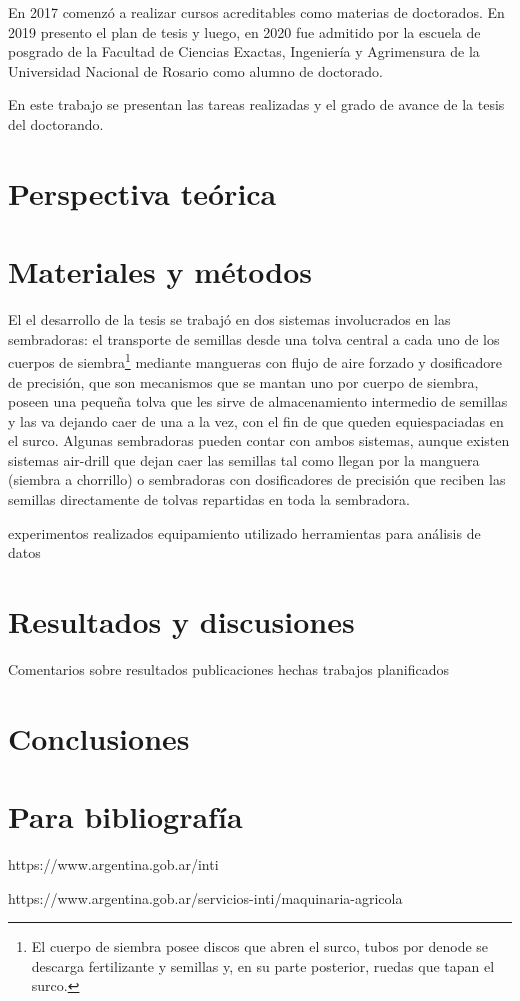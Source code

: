 \documentclass[12pt]{article}
\begin{document}
    En 2017 comenzó a realizar cursos acreditables como materias de doctorados. En 2019 presento el plan de tesis y luego, en 2020 fue admitido por la escuela de posgrado de la Facultad de Ciencias Exactas, Ingeniería y Agrimensura de la Universidad Nacional de Rosario como alumno de doctorado.
    
    En este trabajo se presentan las tareas realizadas y el grado de avance de la tesis del doctorando.
    
    \section{Perspectiva teórica}
    
    
    
    \section{Materiales y métodos}
	
    El el desarrollo de la tesis se trabajó en dos sistemas involucrados en las sembradoras: el transporte de semillas desde una tolva central a cada uno de los cuerpos de siembra\footnote{El cuerpo de siembra posee discos que abren el surco, tubos por denode se descarga fertilizante y semillas y, en su parte posterior, ruedas que tapan el surco.} mediante mangueras con flujo de aire forzado y dosificadore de precisión, que son mecanismos que se mantan uno por cuerpo de siembra, poseen una pequeña tolva que les sirve de almacenamiento intermedio de semillas y las va dejando caer de una a la vez, con el fin de que queden equiespaciadas en el surco. Algunas sembradoras pueden contar con ambos sistemas, aunque existen sistemas air-drill que dejan caer las semillas tal como llegan por la manguera (siembra a chorrillo) o sembradoras con dosificadores de precisión que reciben las semillas directamente de tolvas repartidas en toda la sembradora.
    
	
    experimentos realizados
    equipamiento utilizado
    herramientas para análisis de datos    
    
    
    \section{Resultados y discusiones}
    
    Comentarios sobre resultados
    publicaciones hechas
    trabajos planificados
    
    
	\section{Conclusiones}
	
	\section{Para bibliografía}
	
	https://www.argentina.gob.ar/inti
	
    https://www.argentina.gob.ar/servicios-inti/maquinaria-agricola
    
\end{document}
